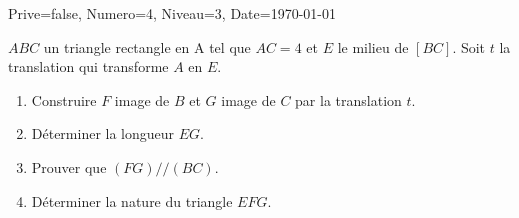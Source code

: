 \documentclass[a4paper,12pt]{article}
\begin{document}
\begin{Maquette}[DM]{Prive=false, Numero=4, Niveau=3, Date=\today}
\begin{exercice}
$ABC$ un triangle rectangle en A tel que $AC=4 $ et $E$ le milieu de $[BC]$. Soit $t$ la translation qui transforme $A$ en $E$.
\begin{enumerate}
\item Construire $F$ image de $B$ et $G$ image de $C$ par la translation $t$.
\item Déterminer la longueur $EG$.
\item Prouver que $(FG)//(BC)$.
\item Déterminer la nature du triangle $EFG$. 
\end{enumerate}
\end{exercice}
\end{Maquette}
\end{document}
